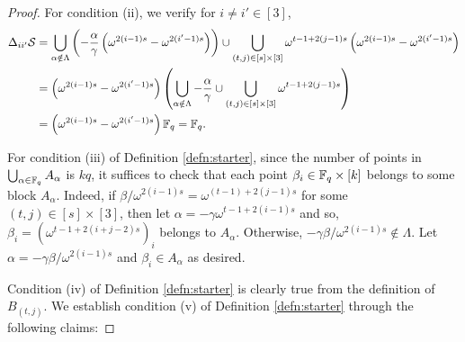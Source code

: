 \documentclass[draft, 11pt]{article}
\begin{document}
\begin{proof}
For condition (ii), %
we verify for $i\ne i'\in [3]$, {
\begin{align*}
\Delta_{ii'}\mathcal S 
&= \bigcup_{\alpha\notin \Lambda} \left( -\frac{\alpha}{\gamma}
\left(\omega^{2(i-1)s}-\omega^{2(i'-1)s}\right)\right)
\cup \bigcup_{(t,j)\in [s]\times [3]} \omega^{t-1+2(j-1)s}\left(\omega^{2(i-1)s}-\omega^{2(i'-1)s}\right) \\
&= \left(\omega^{2(i-1)s}-\omega^{2(i'-1)s}\right)
 \left(\bigcup_{\alpha\notin\Lambda} -\frac{\alpha}{\gamma} \cup \bigcup_{(t,j)\in [s]\times [3]} \omega^{t-1+2(j-1)s} \right)\\
&= \left(\omega^{2(i-1)s}-\omega^{2(i'-1)s}\right) \mathbb F_q=\mathbb F_q.
\end{align*}
}

For condition (iii) of Definition \ref{defn:starter}, since the
number of points in $\bigcup_{\alpha\in \mathbb F_q} A_\alpha$ is
$kq$, it suffices to check that each point $\beta_i\in\mathbb F_q\times
[k]$ belongs to some block $A_\alpha$.
Indeed, if $\beta/\omega^{2(i-1)s}=\omega^{(t-1)+2(j-1)s}$ 
for some $(t,j)\in [s]\times[3]$, then let $\alpha=-\gamma\omega^{t-1+2(i-1)s}$ and so,
$\beta_i=\left(\omega^{t-1+2(i+j-2)s}\right)_i$ belongs to $A_\alpha$.
Otherwise,  $-\gamma\beta/\omega^{2(i-1)s}\notin\Lambda$. Let
$\alpha=-\gamma\beta/\omega^{2(i-1)s}$ and $\beta_i\in A_\alpha$ as desired.




Condition (iv) of Definition \ref{defn:starter} is clearly true from
the definition of $B_{(t,j)}$. We establish condition (v) of
Definition \ref{defn:starter} through the following claims:


\end{proof}
\end{document}
